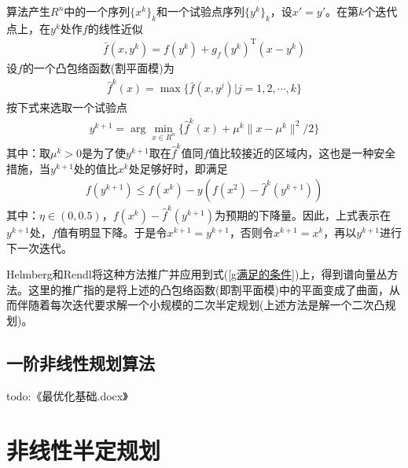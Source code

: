         \par
        算法产生$R^n$中的一个序列$\{x^k\}_k$和一个试验点序列$\{y^k\}_k$，设$x'=y'$。在第$k$个迭代点上，在$y^k$处作$f$的线性近似
        \begin{align*}
        {\bar {f}}(x,y^k) = f(y^k)+g_f(y^k)^\mathrm{T} (x- y^k)
        \end{align*}
        设$f$的一个凸包络函数(割平面模)为
        \begin{align*}
        {\hat {f}^k}(x) = {\max}\{{\bar {f}}(x,y^j)|j=1,2,\cdots,k\}
        \end{align*}
        按下式来选取一个试验点
        \begin{align*}
        y^{k+1} = \arg{\mathop {\min}\limits_{x\in R^n} }\{{\hat {f}^k}(x)+{\mu}^k\|x-{\mu}^k\|^2/2 \}
        \end{align*}
        其中：取${\mu}^k>0$是为了使$y^{k+1}$取在${\hat {f}^k}$值同$f$值比较接近的区域内，这也是一种安全措施，当$y^{k+1}$处的值比$x^k$处足够好时，即满足
        \begin{align*}
        f(y^{k+1}) \leqslant f(x^k) - y(f(x^2)-{\hat {f}^k}(y^{k+1}))
        \end{align*}
        其中：$\eta \in (0,0.5)$，$f(x^k)-{\hat {f}^k}(y^{k+1})$为预期的下降量。因此，上式表示在$y^{k+1}$处，$f$值有明显下降。于是令$x^{k+1}=y^{k+1}$，否则令$x^{k+1}=x^k$，再以$y^{k+1}$进行下一次迭代。
        \par
        Helmberg和Rendl将这种方法推广并应用到式(\ref{g满足的条件})上，得到谱向量丛方法。这里的推广指的是将上述的凸包络函数(即割平面模)中的平面变成了曲面，从而伴随着每次迭代要求解一个小规模的二次半定规划(上述方法是解一个二次凸规划)。
    \subsection{一阶非线性规划算法}
        todo:《最优化基础.docx》
\section{非线性半定规划}
